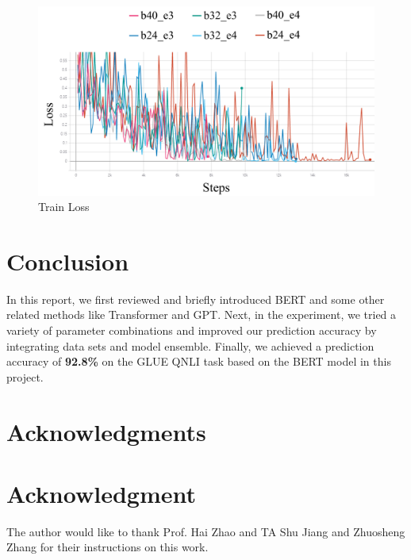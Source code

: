 \documentclass[10pt,journal,compsoc]{IEEEtran}
\begin{document}
\begin{figure}[!t]
  \centering
  \includegraphics[width=1\linewidth]{images/train_loss}
  \caption{Train Loss}
  \label{fig:train_loss}
\end{figure}

\section{Conclusion}
\label{sec:conclusion}

In this report, we first reviewed and briefly introduced BERT and some other related methods like Transformer and GPT. Next, in the experiment, we tried a variety of parameter combinations and improved our prediction accuracy by integrating data sets and model ensemble. Finally, we achieved a prediction accuracy of \textbf{92.8\%} on the GLUE QNLI task based on the BERT model in this project.


\ifCLASSOPTIONcompsoc
  \section*{Acknowledgments}
\else
  \section*{Acknowledgment}
\fi


The author would like to thank Prof. Hai Zhao and TA Shu Jiang and Zhuosheng Zhang for their instructions on this work.


\ifCLASSOPTIONcaptionsoff
  \newpage
\fi
\end{document}
